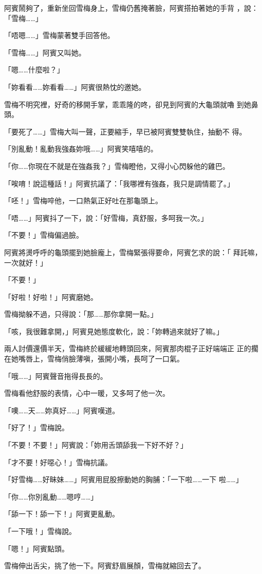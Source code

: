 阿賓鬧夠了，重新坐回雪梅身上，雪梅仍舊掩著臉，阿賓搭拍著她的手背
，說：「雪梅……」

「唔嗯……」雪梅蒙著雙手回答他。

「雪梅……」阿賓又叫她。

「嗯……什麼啦？」

「妳看看……妳看看……」阿賓很熱忱的邀她。

雪梅不明究裡，好奇的移開手掌，乖乖隆的咚，卻見到阿賓的大龜頭就嚕
到她鼻頭。

「要死了……」雪梅大叫一聲，正要縮手，早已被阿賓雙雙執住，抽動不
得。

「別亂動！亂動我強姦妳哦……」阿賓笑嘻嘻的。

「你……你現在不就是在強姦我？」雪梅瞪他，又得小心閃躲他的雞巴。

「唉唷！說這種話！」阿賓抗議了：「我哪裡有強姦，我只是調情罷了。」

「呸！」雪梅啐他，一口熱氣正好吐在那龜頭上。

「唔……」阿賓抖了一下，說：「好雪梅，真舒服，多呵我一次。」

「不要！」雪梅偏過臉。

阿賓將燙呼呼的龜頭擺到她臉龐上，雪梅緊張得要命，阿賓乞求的說：「
拜託嘛，一次就好！」

「不要！」

「好啦！好啦！」阿賓磨她。

雪梅拗躲不過，只得說：「那……那你拿開一點。」

「咳，我很難拿開，」阿賓見她態度軟化，說：「妳轉過來就好了嘛。」

兩人討價還價半天，雪梅終於緩緩地轉頭回來，阿賓那肉棍子正好端端正
正的擱在她嘴唇上，雪梅俏臉薄嗔，張開小嘴，長呵了一口氣。

「哦……」阿賓聲音拖得長長的。

雪梅看他舒服的表情，心中一暖，又多呵了他一次。

「噢……天……妳真好……」阿賓嘆道。

「好了！」雪梅說。

「不要！不要！」阿賓說：「妳用舌頭舔我一下好不好？」

「才不要！好噁心！」雪梅抗議。

「好雪梅……好眛妹……」阿賓用屁股擦動她的胸脯：「一下啦……一下
啦……」

「你……你別亂動……嗯哼……」

「舔一下！舔一下！」阿賓更亂動。

「一下哦！」雪梅說。

「嗯！」阿賓點頭。

雪梅伸出舌尖，挑了他一下。阿賓舒眉展顏，雪梅就縮回去了。

